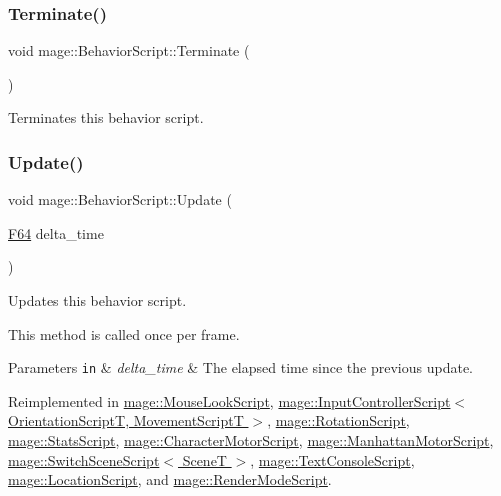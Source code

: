 \subsubsection{\texorpdfstring{Terminate()}{Terminate()}}
{\footnotesize\ttfamily void mage\+::\+Behavior\+Script\+::\+Terminate (\begin{DoxyParamCaption}{ }\end{DoxyParamCaption})\hspace{0.3cm}{\ttfamily [noexcept]}}

Terminates this behavior script. \hypertarget{classmage_1_1_behavior_script_a58c0fb3e1f2f3fb3a41e658a99b84a21}{}\label{classmage_1_1_behavior_script_a58c0fb3e1f2f3fb3a41e658a99b84a21} 
\subsubsection{\texorpdfstring{Update()}{Update()}}
{\footnotesize\ttfamily void mage\+::\+Behavior\+Script\+::\+Update (\begin{DoxyParamCaption}\item[{\hyperlink{namespacemage_ad26233bbec640deda836e572c1a23708}{F64}}]{delta\+\_\+time }\end{DoxyParamCaption})\hspace{0.3cm}{\ttfamily [virtual]}}

Updates this behavior script.

This method is called once per frame.


\begin{DoxyParams}[1]{Parameters}
\mbox{\tt in}  & {\em delta\+\_\+time} & The elapsed time since the previous update. \\
\hline
\end{DoxyParams}


Reimplemented in \hyperlink{classmage_1_1_mouse_look_script_a977db57418697a4dd10000e79625d1e3}{mage\+::\+Mouse\+Look\+Script}, \hyperlink{classmage_1_1_input_controller_script_a066cd5ed9ef4d05e4442f42e372c9f2d}{mage\+::\+Input\+Controller\+Script$<$ Orientation\+Script\+T, Movement\+Script\+T $>$}, \hyperlink{classmage_1_1_rotation_script_a767affada9bd2fcd2187365dbfd79b5b}{mage\+::\+Rotation\+Script}, \hyperlink{classmage_1_1_stats_script_ab25f82f68cfb2db9e13f210dcc0d5780}{mage\+::\+Stats\+Script}, \hyperlink{classmage_1_1_character_motor_script_a37595062021e541c2d30caf56c38aedb}{mage\+::\+Character\+Motor\+Script}, \hyperlink{classmage_1_1_manhattan_motor_script_a5a925579b52039b268f469abc2ef0c4a}{mage\+::\+Manhattan\+Motor\+Script}, \hyperlink{classmage_1_1_switch_scene_script_a30c81a893629c753f19408b552199a07}{mage\+::\+Switch\+Scene\+Script$<$ Scene\+T $>$}, \hyperlink{classmage_1_1_text_console_script_a918107cba0825317ec0708056ed619c7}{mage\+::\+Text\+Console\+Script}, \hyperlink{classmage_1_1_location_script_a84bebc61cb12f2af1afa8260f7cb2aca}{mage\+::\+Location\+Script}, and \hyperlink{classmage_1_1_render_mode_script_a6f3d33acfda97579c767881ed976aba3}{mage\+::\+Render\+Mode\+Script}.



